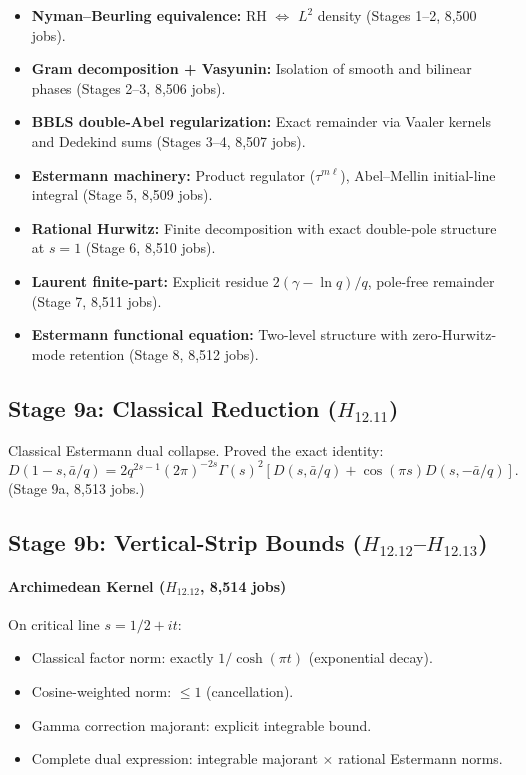 \documentclass[11pt,a4paper]{article}
\theoremstyle{plain}
\theoremstyle{definition}
\theoremstyle{remark}
\begin{document}
\begin{itemize}[leftmargin=2em]
  \item \textbf{Nyman--Beurling equivalence:} RH $\Leftrightarrow$ $L^2$ density (Stages 1--2, 8,500 jobs).
  \item \textbf{Gram decomposition + Vasyunin:} Isolation of smooth and bilinear phases (Stages 2--3, 8,506 jobs).
  \item \textbf{BBLS double-Abel regularization:} Exact remainder via Vaaler kernels and Dedekind sums (Stages 3--4, 8,507 jobs).
  \item \textbf{Estermann machinery:} Product regulator ($\tau^{m\ell}$), Abel--Mellin initial-line integral (Stage 5, 8,509 jobs).
  \item \textbf{Rational Hurwitz:} Finite decomposition with exact double-pole structure at $s=1$ (Stage 6, 8,510 jobs).
  \item \textbf{Laurent finite-part:} Explicit residue $2(\gamma - \ln q)/q$, pole-free remainder (Stage 7, 8,511 jobs).
  \item \textbf{Estermann functional equation:} Two-level structure with zero-Hurwitz-mode retention (Stage 8, 8,512 jobs).
\end{itemize}

\subsection{Stage 9a: Classical Reduction ($H_{12.11}$)}

Classical Estermann dual collapse. Proved the exact identity:
\[
D(1-s, \bar{a}/q) = 2q^{2s-1}(2\pi)^{-2s}\Gamma(s)^2 \left[ D(s, \bar{a}/q) + \cos(\pi s) D(s, -\bar{a}/q) \right].
\]
(Stage 9a, 8,513 jobs.)

\subsection{Stage 9b: Vertical-Strip Bounds ($H_{12.12}$--$H_{12.13}$)}

\paragraph{Archimedean Kernel ($H_{12.12}$, 8,514 jobs)}

On critical line $s = 1/2 + it$:
\begin{itemize}[leftmargin=2em]
  \item Classical factor norm: exactly $1/\cosh(\pi t)$ (exponential decay).
  \item Cosine-weighted norm: $\le 1$ (cancellation).
  \item Gamma correction majorant: explicit integrable bound.
  \item Complete dual expression: integrable majorant $\times$ rational Estermann norms.
\end{itemize}
\end{document}
